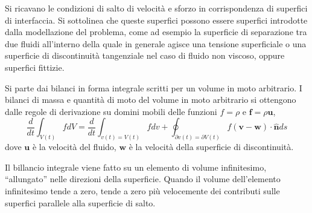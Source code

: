 
Si ricavano le condizioni di salto di velocità e sforzo in corrispondenza di superfici di interfaccia.
 Si sottolinea che queste superfici possono essere superfici introdotte dalla modellazione del problema,
 come ad esempio la superficie di separazione tra due fluidi all'interno della quale in generale agisce
 una tensione superficiale o una superficie di discontinuità tangenziale nel caso di fluido non viscoso,
 oppure superfici fittizie.
 
Si parte dai bilanci in forma integrale scritti per un volume in moto arbitrario. I bilanci di massa e quantità di moto
 del volume in moto arbitrario si ottengono dalle regole di derivazione su domini mobili delle funzioni
 $f = \rho$ e $\bm{f} = \rho \bm{u}$,
\begin{equation}
 \frac{d}{dt} \int_{V(t)} f dV 
    = \frac{d}{dt} \int_{v(t)=V(t)} f dv + \oint_{\partial v(t)=\partial V(t)} f(\bm{v}-\bm{w}) \cdot \bm{\hat{n}} ds 
\end{equation}
dove $\bm{u}$ è la velocità del fluido, $\bm{w}$ è la velocità della superficie di discontinuità.

Il billancio integrale viene fatto su un elemento di volume infinitesimo, ``allungato'' nelle direzioni della superficie.
 Quando il volume dell'elemento infinitesimo tende a zero, tende a zero più velocemente dei contributi sulle superfici
 parallele alla superficie di salto.
 
\begin{figure}[h]
\centering
 \qquad \qquad
{}
\end{figure}

